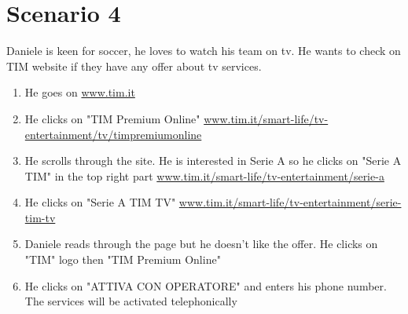 \section{Scenario 4}
Daniele is keen for soccer, he loves to watch his team on tv. He wants to check on TIM website if they have any offer about tv services.

\begin{enumerate}
	\item He goes on \url{www.tim.it}
	\item He clicks on "TIM Premium Online" \url{www.tim.it/smart-life/tv-entertainment/tv/timpremiumonline}
	\item He scrolls through the site. He is interested in Serie A so he clicks on "Serie A TIM" in the top right part \url{www.tim.it/smart-life/tv-entertainment/serie-a}
	\item He clicks on "Serie A TIM TV" \url{www.tim.it/smart-life/tv-entertainment/serie-tim-tv}
	\item Daniele reads through the page but he doesn't like the offer. He clicks on "TIM" logo then "TIM Premium Online"
	\item He clicks on "ATTIVA CON OPERATORE" and enters his phone number. The services will be activated telephonically
\end{enumerate}
\newpage
